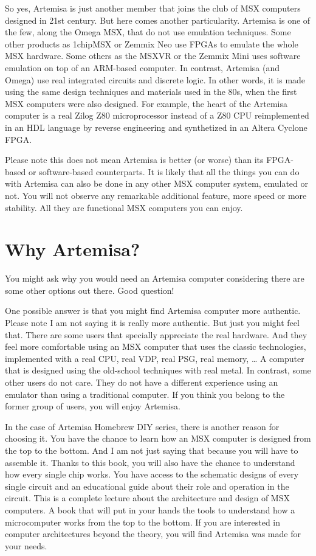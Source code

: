 So yes, Artemisa is just another member that joins the club of MSX computers designed in 21st century. But here comes another particularity. Artemisa is one of the few, along the Omega MSX, that do not use emulation techniques. Some other products as 1chipMSX or Zemmix Neo use FPGAs to emulate the whole MSX hardware. Some others as the MSXVR or the Zemmix Mini uses software emulation on top of an ARM-based computer. In contrast, Artemisa (and Omega) use real integrated circuits and discrete logic. In other words, it is made using the same design techniques and materials used in the 80s, when the first MSX computers were also designed. For example, the heart of the Artemisa computer is a real Zilog Z80 microprocessor instead of a Z80 CPU reimplemented in an HDL language by reverse engineering and synthetized in an Altera Cyclone FPGA.

Please note this does not mean Artemisa is better (or worse) than its FPGA-based or software-based counterparts. It is likely that all the things you can do with Artemisa can also be done in any other MSX computer system, emulated or not. You will not observe any remarkable additional feature, more speed or more stability. All they are functional MSX computers you can enjoy.

\section{Why Artemisa?}

You might ask why you would need an Artemisa computer considering there are some other options out there. Good question!

One possible answer is that you might find Artemisa computer more authentic. Please note I am not saying it is really more authentic. But just you might feel that. There are some users that specially appreciate the real hardware. And they feel more comfortable using an MSX computer that uses the classic technologies, implemented with a real CPU, real VDP, real PSG, real memory, … A computer that is designed using the old-school techniques with real metal. In contrast, some other users do not care. They do not have a different experience using an emulator than using a traditional computer. If you think you belong to the former group of users, you will enjoy Artemisa. 

In the case of Artemisa Homebrew DIY series, there is another reason for choosing it. You have the chance to learn how an MSX computer is designed from the top to the bottom. And I am not just saying that because you will have to assemble it. Thanks to this book, you will also have the chance to understand how every single chip works. You have access to the schematic designs of every single circuit and an educational guide about their role and operation in the circuit. This is a complete lecture about the architecture and design of MSX computers. A book that will put in your hands the tools to understand how a microcomputer works from the top to the bottom. If you are interested in computer architectures beyond the theory, you will find Artemisa was made for your needs. 

